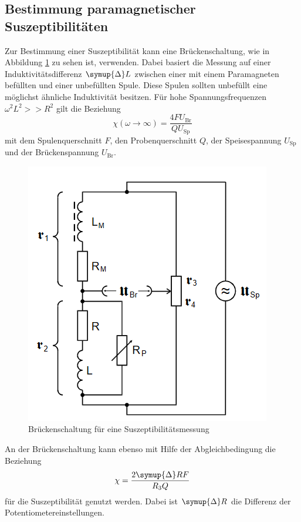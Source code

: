\subsection{Bestimmung paramagnetischer Suszeptibilitäten}
Zur Bestimmung einer Suszeptibilität kann eine Brückenschaltung, wie in Abbildung \ref{fig:sus} zu sehen ist, verwenden. 
Dabei basiert die Messung auf einer Induktivitätsdifferenz $\symup{\Delta}L$ zwischen einer mit einem Paramagneten befüllten und einer unbefüllten Spule.
Diese Spulen sollten unbefüllt eine möglichst ähnliche Induktivität besitzen.
Für hohe Spannungsfrequenzen $\omega^2 L^2 >> R^2$ gilt die Beziehung
\begin{equation}
    \chi\left(\omega \to \infty \right) =\frac{4 F U_\text{Br}}{Q U_\text{Sp}}
\end{equation}
mit dem Spulenquerschnitt $F$, den Probenquerschnitt $Q$, der Speisespannung $U_\text{Sp}$ und der Brückenspannung $U_\text{Br}$.
\begin{figure}
    \centering
    \includegraphics[scale=0.4]{pics/sus.png}
    \caption{Brückenschaltung für eine Suszeptibilitätsmessung \cite{v606}}
    \label{fig:sus}
  \end{figure}
An der Brückenschaltung kann ebenso mit Hilfe der Abgleichbedingung die Beziehung
\begin{equation}
    \chi = \frac{2 \symup{\Delta}R F}{R_3 Q}
\end{equation}
für die Suszeptibilität genutzt werden. Dabei ist $\symup{\Delta}R$ die Differenz der Potentiometereinstellungen.
